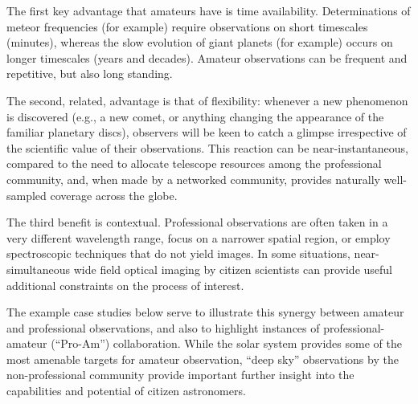 \documentclass{ar2e}
\begin{document}
The first key advantage that amateurs have is time availability. Determinations
of meteor frequencies (for example) require observations on short timescales
(minutes), whereas the slow evolution of giant planets (for example) occurs on
longer timescales (years and decades).  Amateur observations can be frequent and
repetitive, but also long standing. 

The second, related, advantage is that of flexibility: whenever a new phenomenon
is discovered (e.g., a new comet, or anything changing the appearance of the
familiar planetary discs), observers will be keen to catch a glimpse
irrespective of the scientific value of their observations.  This reaction can
be near-instantaneous, compared to the need to allocate telescope resources
among the professional community, and, when made by a networked community,
provides naturally well-sampled coverage across the globe.

The third benefit is contextual.  Professional observations are often taken in a
very different wavelength range, focus on a narrower spatial region, or employ
spectroscopic techniques that do not yield images. In some situations,
near-simultaneous wide field optical imaging by citizen scientists can provide
useful additional constraints on the process of interest.

The example case studies below serve to illustrate this synergy between amateur
and professional observations, and also to highlight instances of
professional-amateur (``Pro-Am'') collaboration. While the solar system provides
some of the most amenable targets for amateur observation, ``deep sky''
observations by the non-professional community provide important further insight
into the capabilities and potential of citizen astronomers.


\end{document}
